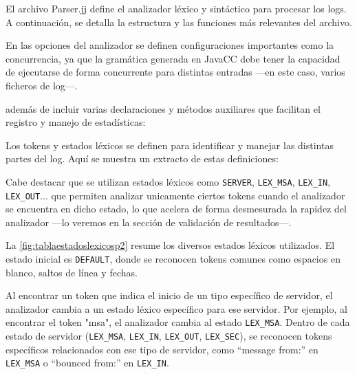 El archivo Parser.jj define el analizador léxico y sintáctico para procesar los logs. A continuación, se detalla la estructura y las funciones más relevantes del archivo.

En las opciones del analizador se definen configuraciones importantes como la concurrencia, ya que la gramática generada en JavaCC debe tener la capacidad de ejecutarse de forma concurrente para distintas entradas ---en este caso, varios ficheros de log---.

\lstset{inputencoding=utf8/latin1}


además de incluir varias declaraciones y métodos auxiliares que facilitan el registro y manejo de estadísticas:

\lstset{inputencoding=utf8/latin1}


Los tokens y estados léxicos se definen para identificar y manejar las distintas partes del log. Aquí se muestra un extracto de estas definiciones:

\lstset{inputencoding=utf8/latin1}


Cabe destacar que se utilizan estados léxicos como \lstinline|SERVER|, \lstinline|LEX_MSA|, \lstinline|LEX_IN|, \lstinline|LEX_OUT|... que permiten analizar unicamente ciertos tokens cuando el analizador se encuentra en dicho estado, lo que acelera de forma desmesurada la rapidez del analizador ---lo veremos en la sección de validación de resultados---.



La \autoref{fig:tablaestadoslexicosp2} resume los diversos estados léxicos utilizados. El estado inicial es \lstinline|DEFAULT|, donde se reconocen tokens comunes como espacios en blanco, saltos de línea y fechas.

Al encontrar un token que indica el inicio de un tipo específico de servidor, el analizador cambia a un estado léxico específico para ese servidor. Por ejemplo, al encontrar el token "msa", el analizador cambia al estado \lstinline|LEX_MSA|. Dentro de cada estado de servidor (\lstinline|LEX_MSA|, \lstinline|LEX_IN|, \lstinline|LEX_OUT|, \lstinline|LEX_SEC|), se reconocen tokens específicos relacionados con ese tipo de servidor, como ``message from:'' en \lstinline|LEX_MSA| o ``bounced from:'' en \lstinline|LEX_IN|.


